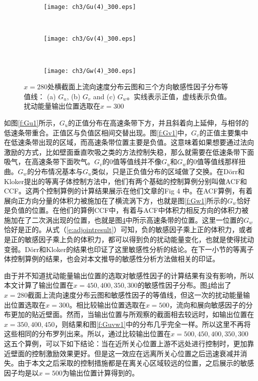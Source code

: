 \begin{figure}[H]
  \centering
  \begin{subfigure}{0.8\textwidth}
  \texttt{[image: ch3/Gu(4)\_300.eps]}
  \caption{\label{f:Gu1_300}}
  \end{subfigure}\\
  \bigskip
  \begin{subfigure}{0.8\textwidth}
  \texttt{[image: ch3/Gv(4)\_300.eps]}
  \caption{\label{f:Gv1_300}}
  \end{subfigure}\\
  \bigskip
  \begin{subfigure}{0.8\textwidth}
  \texttt{[image: ch3/Gw(4)\_300.eps]}
  \caption{\label{f:Gw1_300}}
  \end{subfigure}
  \caption{$x =280$处横截面上流向速度分布云图和三个方向敏感性因子分布等值线： (a) $G_u$, (b) $G_v$ and (c) $G_w$。实线表示正值，虚线表示负值。扰动能量输出位置选取在$x =300$}\label{f:Guvw1_300}
\end{figure}

如图\ref{f:Gu1}所示，$G_u$的正值分布在高速条带下方，并且斜着向上延伸，与相邻的低速条带重合。正值区与负值区相间交替出现。图\ref{f:Gv1}中，$G_v$的正值主要集中在低速条带出现的区域，而高速条带位置主要是负值。这意味着如果想要通过法向激励的方式，比如壁面垂直吹吸之类的方法控制失稳，那么就需要在低速条带下面吸气，在高速条带下面吹气。$G_v$的0值等值线并不像$G_u$和$G_w$的0值等值线那样扭曲。$G_w$的分布情况基本与$G_u$类似，只是正负值分布的区域做了交换。在D\"orr和Kloker\cite{dorr2016}提出的等离子体控制方法中，他们有两个基础的控制算例分别叫做ACF和CCF。这两个控制算例的计算结果展示在他们文章的Fig 4 中。在ACF算例，有着展向正方向分量的体积力被施加在了横流涡下方，也就是图\ref{f:Gw1}所示的$G_w$恰好是负值的位置。在他们的算例CCF中，有着与ACF中体积力相反方向的体积力被施加在了二次涡出现的位置，也就是图\ref{f:Guvw1_300}中所示高速条带的位置。这里一位置的$G_w$恰好是正的。从式（\ref{e:adjointresult}）可知，负的敏感因子乘上正的体积力，或者是正的敏感因子乘上负的体积力，都可以得到负的扰动能量变化，也就是使得扰动变弱。D\"orr和Kloker\cite{dorr2016}的结果也印证了这里敏感性分析的结论。在下一小节的等离子体控制算例的结果，也会对本文推导的敏感性分析方法做相关的印证。

由于并不知道扰动能量输出位置的选取对敏感性因子的计算结果有没有影响，所以本文计算了输出位置在$x=450,400,350,300$的敏感性因子分布。图\ref{f:Guvw1_300}给出了$x=280$截面上流向速度分布云图和敏感性因子的等值线，但这一次的扰动能量输出位置选取在$x=300$。相比较输出位置选取在$x=500$，流向和展向敏感因子的分布更加的贴近壁面。然而，当输出位置与所观察的截面相去较远时，如输出位置在$x=350,400,450$，则结果和图\ref{f:Guvw1}中的分布几乎完全一样。所以这里不再将这些相同的分布罗列出来。所以，通过比较输出位置在$x=500,450,400,350,300$这五个算例，可以下如下结论：当在近所关心位置上游不远处进行控制时，更加靠近壁面的控制激励效果更好。但是这一效应在远离所关心位置之后迅速衰减并消失。由于本文之后采取的控制措施都是在离关心区域较远的位置，之后展示的敏感因子均是以$x=500$为输出位置计算得到的。

